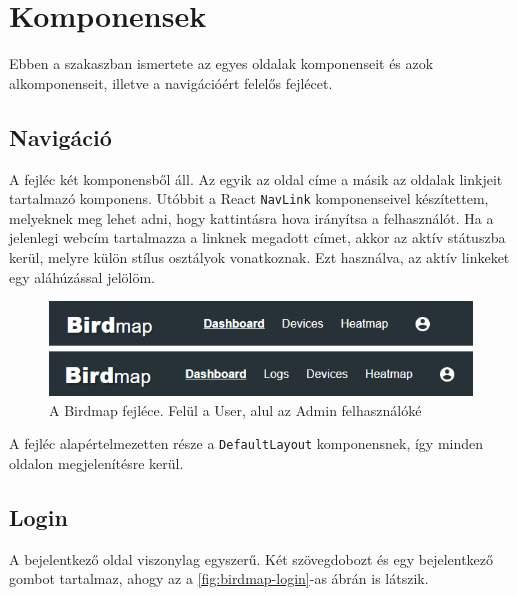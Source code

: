 \section{Komponensek}
Ebben a szakaszban ismertete az egyes oldalak komponenseit és azok alkomponenseit,
illetve a navigációért felelős fejlécet.
\subsection{Navigáció}
A fejléc két komponensből áll. Az egyik az oldal címe a másik az oldalak linkjeit tartalmazó komponens.
Utóbbit a React \verb+NavLink+ komponenseivel készítettem, melyeknek meg lehet adni, hogy kattintásra hova irányítsa a felhasználót.
Ha a jelenlegi webcím tartalmazza a linknek megadott címet, akkor az aktív státuszba kerül, melyre külön stílus osztályok vonatkoznak.
Ezt használva, az aktív linkeket egy aláhúzással jelölöm. 

\begin{figure}[!ht]
    \centering
    \includegraphics[width=150mm, keepaspectratio]{figures/appbar-user-admin.png}
    \caption{A Birdmap fejléce. Felül a User, alul az Admin felhasználóké}
    \label{fig:birdmap-appbar}
\end{figure}

A fejléc alapértelmezetten része a \verb+DefaultLayout+ komponensnek, így minden oldalon megjelenítésre kerül.

\subsection{Login}
A bejelentkező oldal viszonylag egyszerű. Két szövegdobozt és egy bejelentkező gombot tartalmaz, ahogy az a \ref{fig:birdmap-login}-as ábrán is látszik.

